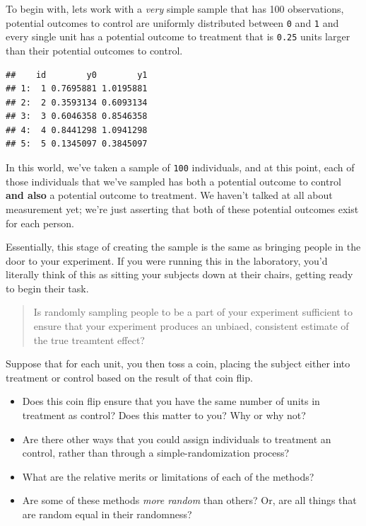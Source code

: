 \documentclass[
]{book}
\providecommand{\tightlist}{%
  \setlength{\itemsep}{0pt}\setlength{\parskip}{0pt}}
\begin{document}
To begin with, lets work with a \emph{very} simple sample that has 100
observations, potential outcomes to control are uniformly distributed
between \texttt{0} and \texttt{1} and every single unit has a potential
outcome to treatment that is \texttt{0.25} units larger than their
potential outcomes to control.

\begin{verbatim}
##    id        y0        y1
## 1:  1 0.7695881 1.0195881
## 2:  2 0.3593134 0.6093134
## 3:  3 0.6046358 0.8546358
## 4:  4 0.8441298 1.0941298
## 5:  5 0.1345097 0.3845097
\end{verbatim}

In this world, we've taken a sample of \texttt{100} individuals, and at
this point, each of those individuals that we've sampled has both a
potential outcome to control \textbf{and also} a potential outcome to
treatment. We haven't talked at all about measurement yet; we're just
asserting that both of these potential outcomes exist for each person.

Essentially, this stage of creating the sample is the same as bringing
people in the door to your experiment. If you were running this in the
laboratory, you'd literally think of this as sitting your subjects down
at their chairs, getting ready to begin their task.

\begin{quote}
Is randomly sampling people to be a part of your experiment sufficient
to ensure that your experiment produces an unbiaed, consistent estimate
of the true treamtent effect?
\end{quote}

Suppose that for each unit, you then toss a coin, placing the subject
either into treatment or control based on the result of that coin flip.

\begin{itemize}
\tightlist
\item
  Does this coin flip ensure that you have the same number of units in
  treatment as control? Does this matter to you? Why or why not?
\item
  Are there other ways that you could assign individuals to treatment an
  control, rather than through a simple-randomization process?
\item
  What are the relative merits or limitations of each of the methods?
\item
  Are some of these methods \emph{more random} than others? Or, are all
  things that are random equal in their randomness?
\end{itemize}
\end{document}
